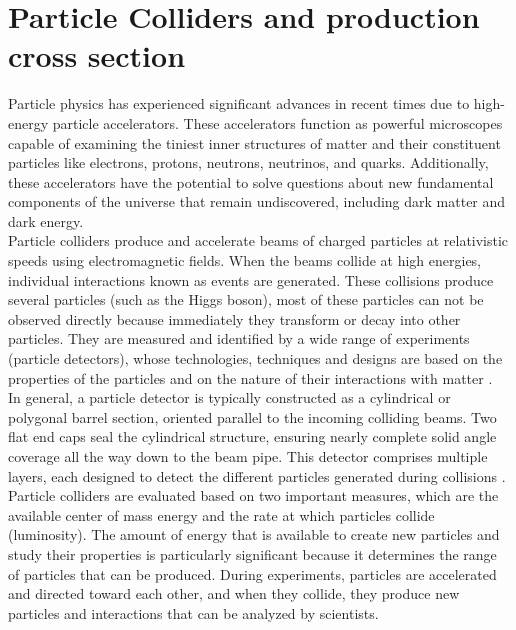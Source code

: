 \section{Particle Colliders and production cross section}

Particle physics has experienced significant advances in recent times due to high-energy particle accelerators. These accelerators function as powerful microscopes capable of examining the tiniest inner structures of matter and their constituent particles like electrons, protons, neutrons, neutrinos, and quarks. Additionally, these accelerators have the potential to solve questions about new fundamental components of the universe that remain undiscovered, including dark matter and dark energy.\\

Particle colliders produce and accelerate beams of charged particles at relativistic speeds using electromagnetic fields. When the beams collide at high energies, individual interactions known as events are generated. These collisions produce several particles (such as the Higgs boson), most of these particles  can not be observed directly because immediately they transform or decay into other particles. They are measured and identified by a wide range of experiments (particle detectors), whose technologies, techniques and designs are based on the properties of the particles and on the nature of their interactions with matter \cite{thomson_2013}.\\

In general, a particle detector is typically constructed as a cylindrical or polygonal barrel section, oriented parallel to the incoming colliding beams. Two flat end caps seal the cylindrical structure, ensuring nearly complete solid angle coverage all the way down to the beam pipe. This detector comprises multiple layers, each designed to detect the different particles generated during collisions \cite{thomson_2013}.\\

Particle colliders are evaluated based on two important measures, which are the available center of mass energy and the rate at which particles collide (luminosity). The amount of energy that is available to create new particles and study their properties is particularly significant because it determines the range of particles that can be produced. During experiments, particles are accelerated and directed toward each other, and when they collide, they produce new particles and interactions that can be analyzed by scientists.\\

